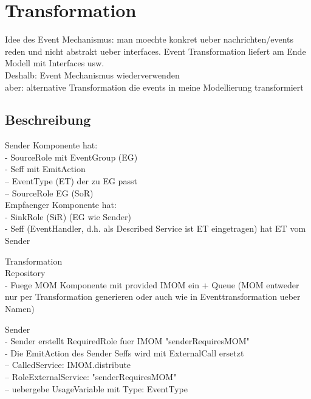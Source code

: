 
\chapter{Transformation}
\label{ch:transformation}
Idee des Event Mechanismus: man moechte konkret ueber nachrichten/events reden und nicht abstrakt ueber interfaces. Event Transformation liefert am Ende Modell mit Interfaces usw. \\
Deshalb: Event Mechanismus wiederverwenden \\

aber: alternative Transformation die events in meine Modellierung transformiert

\section{Beschreibung}
Sender Komponente hat:\\
- SourceRole mit EventGroup (EG)\\
- Seff mit EmitAction\\
-- EventType (ET) der zu EG passt\\
-- SourceRole EG (SoR) \\

Empfaenger Komponente hat:\\
- SinkRole (SiR) (EG wie Sender)\\
- Seff (EventHandler, d.h. als Described Service ist ET eingetragen) hat ET vom Sender


Transformation\\
Repository\\
- Fuege MOM Komponente mit provided IMOM ein + Queue
(MOM entweder nur per Transformation generieren oder auch wie in Eventtransformation ueber Namen)

Sender\\
- Sender erstellt RequiredRole fuer IMOM "senderRequiresMOM"\\
- Die EmitAction des Sender Seffs wird mit ExternalCall ersetzt\\
-- CalledService: IMOM.distribute\\
-- RoleExternalService: "senderRequiresMOM"\\
-- uebergebe UsageVariable mit Type: EventType\\

